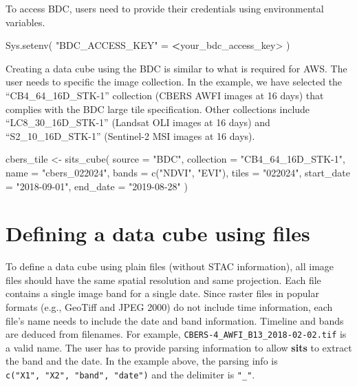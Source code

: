 \documentclass[a4paper,]{tufte-book}
\newenvironment{Shaded}{}{}
\newcommand{\AttributeTok}[1]{\textcolor[rgb]{0.49,0.56,0.16}{#1}}
\newcommand{\ErrorTok}[1]{\textcolor[rgb]{1.00,0.00,0.00}{\textbf{#1}}}
\newcommand{\FunctionTok}[1]{\textcolor[rgb]{0.02,0.16,0.49}{#1}}
\newcommand{\NormalTok}[1]{#1}
\newcommand{\OtherTok}[1]{\textcolor[rgb]{0.00,0.44,0.13}{#1}}
\newcommand{\SpecialCharTok}[1]{\textcolor[rgb]{0.25,0.44,0.63}{#1}}
\newcommand{\StringTok}[1]{\textcolor[rgb]{0.25,0.44,0.63}{#1}}
\begin{document}
To access BDC, users need to provide their credentials using environmental variables.

\begin{Shaded}
\begin{Highlighting}[]
\FunctionTok{Sys.setenv}\NormalTok{(}
    \StringTok{"BDC\_ACCESS\_KEY"} \OtherTok{=} \ErrorTok{\textless{}}\NormalTok{your\_bdc\_access\_key}\SpecialCharTok{\textgreater{}}
\NormalTok{)}
\end{Highlighting}
\end{Shaded}

Creating a data cube using the BDC is similar to what is required for AWS. The user
needs to specific the image collection. In the example, we have selected the
``CB4\_64\_16D\_STK-1'' collection (CBERS AWFI images at 16 days) that complies with
the BDC large tile specification. Other collections include ``LC8\_30\_16D\_STK-1''
(Landsat OLI images at 16 days) and ``S2\_10\_16D\_STK-1'' (Sentinel-2 MSI images
at 16 days).

\begin{Shaded}
\begin{Highlighting}[]
\NormalTok{cbers\_tile }\OtherTok{\textless{}{-}} \FunctionTok{sits\_cube}\NormalTok{(}
    \AttributeTok{source =} \StringTok{"BDC"}\NormalTok{,}
    \AttributeTok{collection =} \StringTok{"CB4\_64\_16D\_STK{-}1"}\NormalTok{,}
    \AttributeTok{name =} \StringTok{"cbers\_022024"}\NormalTok{,}
    \AttributeTok{bands =} \FunctionTok{c}\NormalTok{(}\StringTok{"NDVI"}\NormalTok{, }\StringTok{"EVI"}\NormalTok{),}
    \AttributeTok{tiles =} \StringTok{"022024"}\NormalTok{,}
    \AttributeTok{start\_date =} \StringTok{"2018{-}09{-}01"}\NormalTok{,}
    \AttributeTok{end\_date =} \StringTok{"2019{-}08{-}28"}
\NormalTok{)}
\end{Highlighting}
\end{Shaded}

\hypertarget{defining-a-data-cube-using-files}{%
\section{Defining a data cube using files}\label{defining-a-data-cube-using-files}}

To define a data cube using plain files (without STAC information), all image files should have the same spatial resolution and same projection. Each file contains a single image band for a single date. Since raster files in popular formats (e.g., GeoTiff and JPEG 2000) do not include time information, each file's name needs to include the date and band information. Timeline and bands are deduced from filenames. For example, \texttt{CBERS-4\_AWFI\_B13\_2018-02-02.tif} is a valid name. The user has to provide parsing information to allow \textbf{sits} to extract the band and the date. In the example above, the parsing info is \texttt{c("X1",\ "X2",\ "band",\ "date")} and the delimiter is \texttt{"\_"}.
\end{document}
